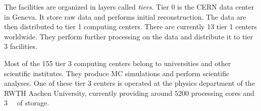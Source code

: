 The facilities are organized in layers called \emph{tiers}. Tier 0 is the \ac{CERN} data center in Geneva. It store raw data and performs initial reconstruction. The data are then distributed to tier 1 computing centers. There are currently 13 tier 1 centers worldwide. They perform further processing on the data and distribute it to tier 3 facilities.

Most of the 155 tier 3 computing centers belong to universities and other scientific institutes. They produce \ac{MC} simulations and perform scientific analyses. One of these tier 3 centers is operated at the physics department of the RWTH Aachen University, currently providing around \num{5200} processing cores and \SI{3}{\peta\byte} of storage. 


